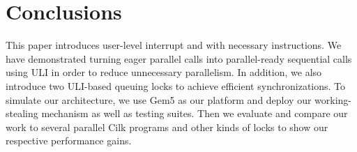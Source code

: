 \section{Conclusions}
This paper introduces user-level interrupt and with necessary instructions. We have demonstrated turning eager parallel calls into parallel-ready sequential calls using ULI in order to reduce unnecessary parallelism. In addition, we also introduce two ULI-based queuing locks to achieve efficient synchronizations. To simulate our architecture, we use Gem5 as our platform and deploy our working-stealing mechanism as well as testing suites. Then we evaluate and compare our work to several parallel Cilk programs and other kinds of locks to show our respective performance gains.
